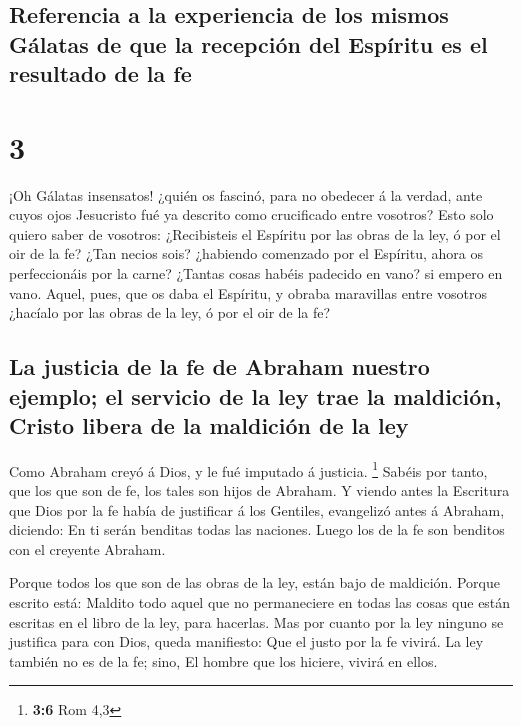 \hypertarget{referencia-a-la-experiencia-de-los-mismos-guxe1latas-de-que-la-recepciuxf3n-del-espuxedritu-es-el-resultado-de-la-fe}{%
\subsection{Referencia a la experiencia de los mismos Gálatas de que la
recepción del Espíritu es el resultado de la
fe}\label{referencia-a-la-experiencia-de-los-mismos-guxe1latas-de-que-la-recepciuxf3n-del-espuxedritu-es-el-resultado-de-la-fe}}

\hypertarget{section-2}{%
\section{3}\label{section-2}}

 ¡Oh Gálatas insensatos! ¿quién os fascinó, para no obedecer
á la verdad, ante cuyos ojos Jesucristo fué ya descrito como crucificado
entre vosotros?  Esto solo quiero saber de vosotros:
¿Recibisteis el Espíritu por las obras de la ley, ó por el oir de la fe?
 ¿Tan necios sois? ¿habiendo comenzado por el Espíritu,
ahora os perfeccionáis por la carne?  ¿Tantas cosas habéis
padecido en vano? si empero en vano.  Aquel, pues, que os
daba el Espíritu, y obraba maravillas entre vosotros ¿hacíalo por las
obras de la ley, ó por el oir de la fe?

\hypertarget{la-justicia-de-la-fe-de-abraham-nuestro-ejemplo-el-servicio-de-la-ley-trae-la-maldiciuxf3n-cristo-libera-de-la-maldiciuxf3n-de-la-ley}{%
\subsection{La justicia de la fe de Abraham nuestro ejemplo; el servicio
de la ley trae la maldición, Cristo libera de la maldición de la
ley}\label{la-justicia-de-la-fe-de-abraham-nuestro-ejemplo-el-servicio-de-la-ley-trae-la-maldiciuxf3n-cristo-libera-de-la-maldiciuxf3n-de-la-ley}}

 Como Abraham creyó á Dios, y le fué imputado á justicia.
\footnote{\textbf{3:6} Rom 4,3}  Sabéis por tanto, que los
que son de fe, los tales son hijos de Abraham.  Y viendo
antes la Escritura que Dios por la fe había de justificar á los
Gentiles, evangelizó antes á Abraham, diciendo: En ti serán benditas
todas las naciones.  Luego los de la fe son benditos con el
creyente Abraham.

 Porque todos los que son de las obras de la ley, están
bajo de maldición. Porque escrito está: Maldito todo aquel que no
permaneciere en todas las cosas que están escritas en el libro de la
ley, para hacerlas.  Mas por cuanto por la ley ninguno se
justifica para con Dios, queda manifiesto: Que el justo por la fe
vivirá.  La ley también no es de la fe; sino, El hombre que
los hiciere, vivirá en ellos.

